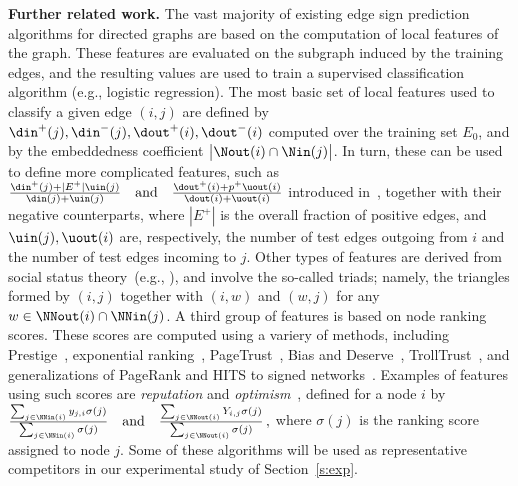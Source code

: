\label{ssec:further_related}
{\bf Further related work.} The vast majority of existing edge sign prediction algorithms for directed graphs are based on the computation of local features of the graph. These features are evaluated on the subgraph induced by the training edges, and the resulting values are used to train a supervised classification algorithm (e.g., logistic regression). The most basic set of local features used to classify a given edge $(i,j)$ are defined by 
$\din^+(j),\din^-(j),\dout^+(i),\dout^-(i)$ computed over the training set $E_0$, and by the embeddedness coefficient $\big|\Nout(i) \cap \Nin(j)\big|$. In turn, these can be used to define more complicated features, such as
\(
	\frac{\din^+(j) + |E^+|\uin(j)}{\din(j) + \uin(j)}
\quad\text{and}\quad
	\frac{\dout^+(i) + p^+\uout(i)}{\dout(i) + \uout(i)}
\)
introduced in~\cite{Bayesian15}, together with their negative counterparts, where $|E^+|$ is the overall fraction of positive edges, and $\uin(j),\uout(i)$ are, respectively, the number of test edges outgoing from $i$ and the number of test edges incoming to $j$.
Other types of features are derived from social status theory~(e.g., \cite{Leskovec2010}), and involve the so-called triads; namely, the triangles formed by $(i,j)$ together with $(i,w)$ and $(w,j)$ for any $w \in \NNout(i) \cap \NNin(j)$. A third group of features is based on node ranking scores. These scores are computed using a variery of methods, including Prestige~\cite{zolfaghar2010mining}, exponential ranking~\cite{traag2010exponential}, PageTrust~\cite{de2008pagetrust}, Bias and Deserve~\cite{mishra2011finding}, TrollTrust~\cite{wu2016troll}, and generalizations of PageRank and HITS to signed networks~\cite{shahriari2014ranking}. Examples of features using such scores are \textsl{reputation} and \textsl{optimism}~\cite{shahriari2014ranking}, defined for a node $i$ by
\(
	\frac{\sum_{j \in \NNin(i)} y_{j,i}\sigma(j)}{\sum_{j \in \NNin(i)} \sigma(j)}
\quad\text{and}\quad
	\frac{\sum_{j \in \NNout(i)} Y_{i,j}\sigma(j)}{\sum_{j \in \NNout(i)} \sigma(j)}\,,
\)
where $\sigma(j)$ is the ranking score assigned to node $j$. Some of these algorithms will be used as representative competitors in our experimental study of Section~\ref{s:exp}.

